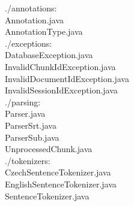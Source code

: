 ./annotations: \\
Annotation.java \\
AnnotationType.java \\

./exceptions: \\
DatabaseException.java \\
InvalidChunkIdException.java \\
InvalidDocumentIdException.java \\
InvalidSessionIdException.java \\

./parsing: \\
Parser.java \\
ParserSrt.java \\
ParserSub.java \\
UnprocessedChunk.java \\

./tokenizers: \\
CzechSentenceTokenizer.java \\
EnglishSentenceTokenizer.java \\
SentenceTokenizer.java \\
